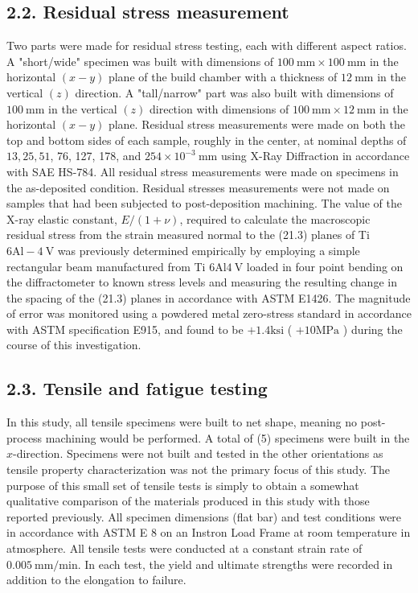 \documentclass[10pt]{article}
\begin{document}
\subsection*{2.2. Residual stress measurement}
Two parts were made for residual stress testing, each with different aspect ratios. A "short/wide" specimen was built with dimensions of $100 \mathrm{~mm} \times 100 \mathrm{~mm}$ in the horizontal $(x-y)$ plane of the build chamber with a thickness of $12 \mathrm{~mm}$ in the vertical $(z)$ direction. A "tall/narrow" part was also built with dimensions of $100 \mathrm{~mm}$ in the vertical $(z)$ direction with dimensions of $100 \mathrm{~mm} \times 12 \mathrm{~mm}$ in the horizontal $(x-y)$ plane. Residual stress measurements were made on both the top and bottom sides of each sample, roughly in the center, at nominal depths of $13,25,51$, 76, 127, 178, and $254 \times 10^{-3} \mathrm{~mm}$ using X-Ray Diffraction in accordance with SAE HS-784. All residual stress measurements were made on specimens in the as-deposited condition. Residual stresses measurements were not made on samples that had been subjected to post-deposition machining. The value of the X-ray elastic constant, $E /(1+\nu)$, required to calculate the macroscopic residual stress from the strain measured normal to the (21.3) planes of Ti $6 \mathrm{Al}-4 \mathrm{~V}$ was previously determined empirically by employing a simple rectangular beam manufactured from Ti 6Al$4 \mathrm{~V}$ loaded in four point bending on the diffractometer to known stress levels and measuring the resulting change in the spacing of the (21.3) planes in accordance with ASTM E1426. The magnitude of error was monitored using a powdered metal zero-stress standard in accordance with ASTM specification E915, and found to be $+1.4 \mathrm{ksi}$ ( $+10 \mathrm{MPa}$ ) during the course of this investigation.

\subsection*{2.3. Tensile and fatigue testing}
In this study, all tensile specimens were built to net shape, meaning no post-process machining would be performed. A total of (5) specimens were built in the $x$-direction. Specimens were not built and tested in the other orientations as tensile property characterization was not the primary focus of this study. The purpose of this small set of tensile tests is simply to obtain a somewhat qualitative comparison of the materials produced in this study with those reported previously. All specimen dimensions (flat bar) and test conditions were in accordance with ASTM E 8 on an Instron Load Frame at room temperature in atmosphere. All tensile tests were conducted at a constant strain rate of $0.005 \mathrm{~mm} / \mathrm{min}$. In each test, the yield and ultimate strengths were recorded in addition to the elongation to failure.
\end{document}
